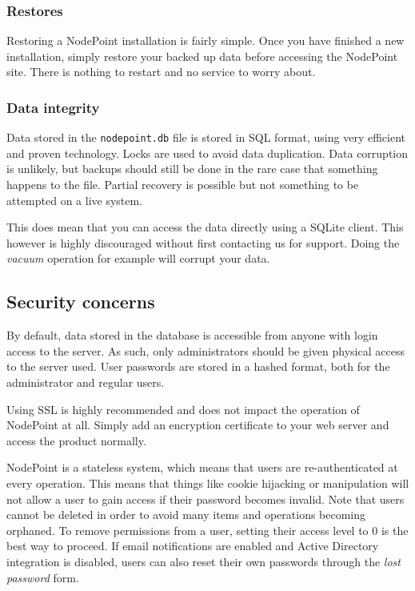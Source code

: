\documentclass[11pt]{article}
\begin{document}
\subsubsection{Restores}
Restoring a NodePoint installation is fairly simple. Once you have finished a new installation, simply restore your backed up data before accessing the NodePoint site. There is nothing to restart and no service to worry about.

\subsubsection{Data integrity}
Data stored in the \texttt{nodepoint.db} file is stored in SQL format, using very efficient and proven technology. Locks are used to avoid data duplication. Data corruption is unlikely, but backups should still be done in the rare case that something happens to the file. Partial recovery is possible but not something to be attempted on a live system.

This does mean that you can access the data directly using a SQLite client. This however is highly discouraged without first contacting us for support. Doing the \textit{vacuum} operation for example will corrupt your data.

\subsection{Security concerns}
By default, data stored in the database is accessible from anyone with login access to the server. As such, only administrators should be given physical access to the server used. User passwords are stored in a hashed format, both for the administrator and regular users.

Using SSL is highly recommended and does not impact the operation of NodePoint at all. Simply add an encryption certificate to your web server and access the product normally.

NodePoint is a stateless system, which means that users are re-authenticated at every operation. This means that things like cookie hijacking or manipulation will not allow a user to gain access if their password becomes invalid. Note that users cannot be deleted in order to avoid many items and operations becoming orphaned. To remove permissions from a user, setting their access level to 0 is the best way to proceed. If email notifications are enabled and Active Directory integration is disabled, users can also reset their own passwords through the \textit{lost password} form.
\end{document}
